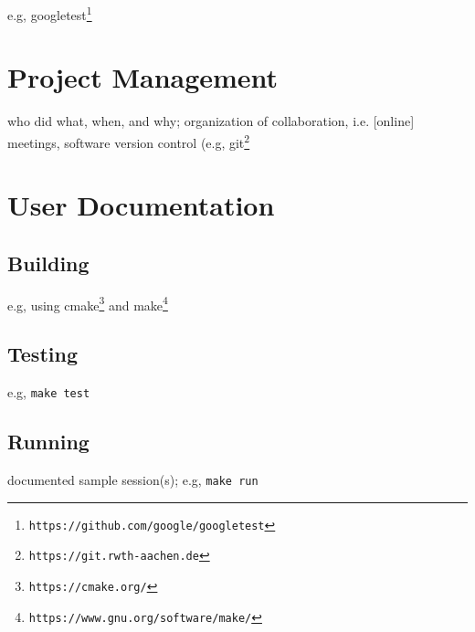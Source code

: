 \documentclass{article}
\begin{document}
e.g, googletest\footnote{\tt https://github.com/google/googletest}

\section{Project Management} \label{ch:projectmanagement}

who did what, when, and why; organization of collaboration, i.e. [online] meetings, software version control (e.g, git\footnote{\tt https://git.rwth-aachen.de}




\appendix

\section{User Documentation} \label{ch:userdoc}

\subsection{Building}

e.g, using cmake\footnote{\tt https://cmake.org/} and make\footnote{\tt https://www.gnu.org/software/make/}


\subsection{Testing}

e.g, \verb!make test!

\subsection{Running}

documented sample session(s); e.g, \verb!make run!
\end{document}
